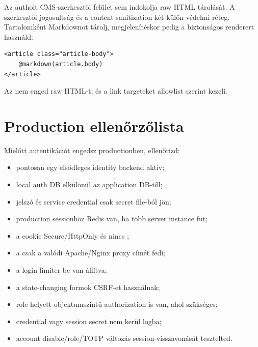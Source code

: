 Az autholt CMS-szerkesztői felület sem indokolja raw HTML tárolását. A szerkesztői jogosultság és a content sanitization két külön védelmi réteg. Tartalomként Markdownot tárolj, megjelenítéskor pedig a biztonságos renderert használd:

\begin{lstlisting}[language=RWLang]
<article class="article-body">
    @markdown(article.body)
</article>
\end{lstlisting}

Az  nem enged raw HTML-t, és a link targeteket allowlist szerint kezeli.

\section{Production ellenőrzőlista}

Mielőtt autentikációt engedsz productionben, ellenőrizd:

\begin{itemize}
  \item pontosan egy elsődleges identity backend aktív;
  \item local auth DB elkülönül az application DB-től;
  \item jelszó és service credential csak secret file-ból jön;
  \item production sessionhöz Redis van, ha több server instance fut;
  \item a cookie Secure/HttpOnly és nincs ;
  \item a  csak a valódi Apache/Nginx proxy címét fedi;
  \item a login limiter be van állítva;
  \item a state-changing formok CSRF-et használnak;
  \item role helyett objektumszintű authorization is van, ahol szükséges;
  \item credential vagy session secret nem kerül logba;
  \item account disable/role/TOTP változás session-visszavonását tesztelted.
\end{itemize}
